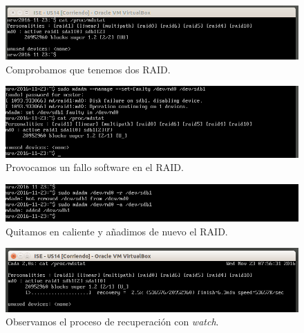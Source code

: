 \documentclass[a4paper,titlepage,12pt]{report}	%
\numberwithin{figure}{section} %
\numberwithin{table}{section} %
\begin{document}
	\begin{figure}[H]
	   \includegraphics[width=\linewidth]{./Imagenes/P3/O1-1.png}
	   \vspace{-0.5cm}
	   \caption[Comprobamos que tenemos dos RAID.]{Comprobamos que tenemos dos RAID.}
	   \label{P3-O1-1}
	\end{figure}

	\begin{figure}[H]
	   \includegraphics[width=\linewidth]{./Imagenes/P3/O1-2.png}
	   \vspace{-0.5cm}
	   \caption[Provocamos un fallo software en el RAID.]{Provocamos un fallo software en el RAID.}
	   \label{P3-O1-2}
	\end{figure}

	\begin{figure}[H]
	   \includegraphics[width=\linewidth]{./Imagenes/P3/O1-3.png}
	   \vspace{-0.5cm}
	   \caption[Quitamos en caliente y añadimos de nuevo el RAID.]{Quitamos en caliente y añadimos de nuevo el RAID.}
	   \label{P3-O1-3}
	\end{figure}

	\begin{figure}[H]
	   \includegraphics[width=\linewidth]{./Imagenes/P3/O1-4.png}
	   \vspace{-0.5cm}
	   \caption[Observamos el proceso de recuperación con \textit{watch}.]{Observamos el proceso de recuperación con \textit{watch}.}
	   \label{P3-O1-4}
	\end{figure}
\end{document}
